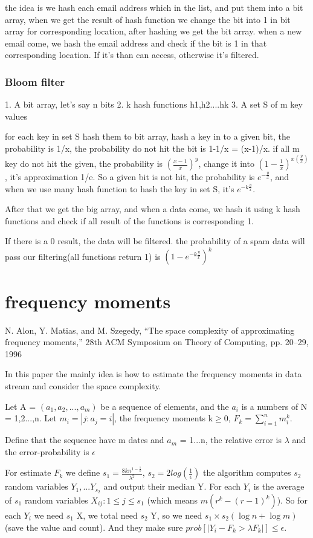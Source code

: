 \documentclass{article}
\begin{document}
the idea is we hash each email address which in the list, and put them into a bit array, when we get the result of hash function we change the bit into 1 in bit array for corresponding location, after hashing we get the bit array. when a new email come, we hash the email address and check if the bit is 1 in that corresponding location. If it's than can access, otherwise it's filtered.

\subsubsection{Bloom filter}
1. A bit array, let's say n bits
2. k hash functions h1,h2....hk
3. A set S of m key values

for each key in set S hash them to bit array, hash a key in to a given bit, the probability is 1/x, the probability do not hit the bit is 1-1/x = (x-1)/x.
if all m key do not hit the given, the probability is $(\frac{x-1}{x})^y$, change it into $(1-\frac{1}{x})^{x(\frac{y}{x})}$, it's approximation 1/e.
So a given bit is not hit, the probability is $e^{-\frac{y}{x}}$, and when we use many hash function to hash the key in set S, it's $e^{-k\frac{y}{x}}$.

After that we get the big array, and when a data come, we hash it using k hash functions and check if all result of the functions is corresponding 1.

If there is a 0 result, the data will be filtered. the probability of a spam data will pass our filtering(all functions return 1) is $(1-e^{-k\frac{y}{x}})^k$


\section{frequency moments}
 N. Alon, Y. Matias, and M. Szegedy, “The space complexity of approximating frequency moments,” 28th ACM Symposium on Theory of Computing, pp. 20–29, 1996
 
 In this paper the mainly idea is how to estimate the frequency moments in data stream and consider the space complexity.
 
 Let A = $(a_1,a_2,...,a_m)$ be a sequence of elements, and the $a_i$ is a numbers of N = {1,2...,n}. Let $m_i = |{j:a_j = i}|$, the frequency moments k$\geq$0, $F_k = \sum_{i=1}^{n}  m_i^k$.
 
 Define that the sequence have m dates and $a_m$ = {1...n}, the relative error is $\lambda$ and the error-probability is $\epsilon$

For estimate $F_k$ we define $s_1 = \frac{8kn^{1-\frac{1}{k}}}{\lambda^2}$, $s_2 = 2log(\frac{1}{\epsilon})$
the algorithm computes $s_2$ random variables $Y_1,...Y_{s_2}$ and output their median Y. For each $Y_i$ is the average of $s_1$ random variables $X_{ij} : 1\leq j \leq s_1$ (which means $m(r^k-(r-1)^k)$). So for each $Y_i$ we need $s_1$ X, we total need $s_2$ Y, so we need $s_1 \times s_2 (\log n + \log m)$ (save the value and count). And they make sure $prob[|Y_i - F_k > \lambda F_k|] \leq \epsilon$.
\end{document}
